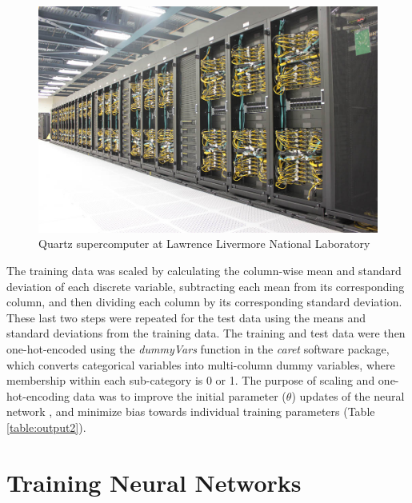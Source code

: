 \begin{figure}
  \centering
  \includegraphics[trim={1cm 5cm 6cm 3cm}, clip, width=\textwidth]{figures/quartz.jpg}
  \caption{Quartz supercomputer at Lawrence Livermore National Laboratory}
  \label{fig:quartz}
\end{figure}

The training data was scaled by calculating the column-wise mean and standard deviation of each discrete variable, subtracting each mean from its corresponding column, and then dividing each column by its corresponding standard deviation.
These last two steps were repeated for the test data using the means and standard deviations from the training data.
The training and test data were then one-hot-encoded using the \textit{dummyVars} function in the \textit{caret} \cite{caret} software package, which converts categorical variables into multi-column dummy variables, where membership within each sub-category is 0 or 1.
The purpose of scaling and one-hot-encoding data was to improve the initial parameter ($\theta$) updates of the neural network \cite{chollet}, and minimize bias towards individual training parameters (Table \ref{table:output2}).

\section{Training Neural Networks}

